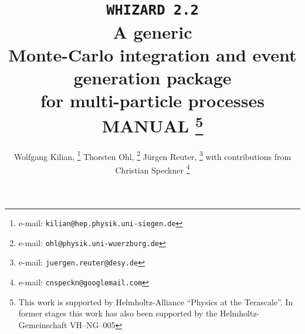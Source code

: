\documentclass[12pt]{book}
\makeatletter
\def\preprintno#1{\def\@preprintno{#1}}
\makeatother
\begin{document}
\preprintno{arXiv:0708.4233 (also based on LC-TOOL-2001-039 (revised))}
\title{%
 \texttt{\huge WHIZARD 2.2} \\[\baselineskip]
 A generic \\ Monte-Carlo integration and event generation package \\
 for multi-particle processes\\[\baselineskip]
 MANUAL
 \footnote{%
 This work is supported by Helmholtz-Alliance ``Physics at the
 Terascale''.   
 In former stages this work has also been supported by
 the Helmholtz-Gemeinschaft VH--NG--005}
 \\[\baselineskip]
}
\def\authormail{\texttt{kilian@physik.uni-siegen.de}, 
  \texttt{ohl@physik.uni-wuerzburg.de},
  \texttt{juergen.reuter@desy.de}, \texttt{cnspeckn@googlemail.com}}
\author{%
  Wolfgang Kilian,%
    \thanks{e-mail: \texttt{kilian@hep.physik.uni-siegen.de}}
  Thorsten Ohl,%
    \thanks{e-mail: \texttt{ohl@physik.uni-wuerzburg.de}}
  J\"urgen Reuter,%
    \thanks{e-mail: \texttt{juergen.reuter@desy.de}}
  with contributions from 
  Christian Speckner
    \thanks{e-mail: \texttt{cnspeckn@googlemail.com}}}
\end{document}
